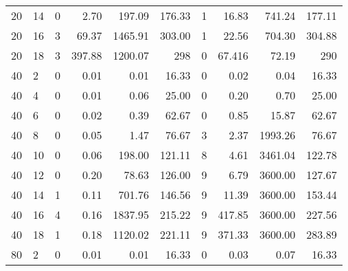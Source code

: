 \begin{appendices}
\begin{table*}[h]
\begin{center}
\begin{tabular} {l l | r r r r | r r r r}
 20 & 14                                 &   0             & 2.70          &  197.09     &  176.33      &  1           &  16.83    &  741.24     &  177.11          \\ 
 20 & 16                                 &   3             & 69.37         &  1465.91    &  303.00      &  1           &  22.56    &  704.30     &  304.88          \\ 
 20 & 18                                 &   3             & 397.88        &  1200.07    &  298         &  0           &  67.416   &  72.19      &  290             \\ 
 40 & 2                                  &   0             & 0.01          &  0.01       &  16.33       &  0           &  0.02     &  0.04       &  16.33           \\ 
 40 & 4                                  &   0             & 0.01          &  0.06       &  25.00       &  0           &  0.20     &  0.70       &  25.00           \\ 
 40 & 6                                  &   0             & 0.02          &  0.39       &  62.67       &  0           &  0.85     &  15.87      &  62.67           \\ 
 40 & 8                                  &   0             & 0.05          &  1.47       &  76.67       &  3           &  2.37     &  1993.26    &  76.67           \\ 
 40 & 10                                 &   0             & 0.06          &  198.00     &  121.11      &  8           &  4.61     &  3461.04    &  122.78          \\ 
 40 & 12                                 &   0             & 0.20          &  78.63      &  126.00      &  9           &  6.79     &  3600.00    &  127.67          \\ 
 40 & 14                                 &   1             & 0.11          &  701.76     &  146.56      &  9           &  11.39    &  3600.00    &  153.44          \\ 
 40 & 16                                 &   4             & 0.16          &  1837.95    &  215.22      &  9           &  417.85   &  3600.00    &  227.56          \\ 
 40 & 18                                 &   1             & 0.18          &  1120.02    &  221.11      &  9           &  371.33   &  3600.00    &  283.89          \\ 
 80 & 2                                  &   0             & 0.01          &  0.01       &  16.33       &  0           &  0.03     &  0.07       &  16.33           \\ 

\end{tabular}
\end{center}
\end{table*}
\end{appendices}
